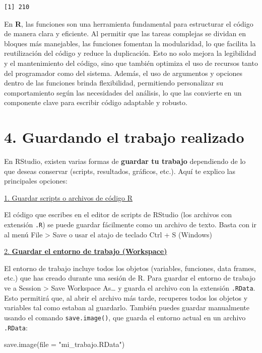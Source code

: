 \documentclass[
  letterpaper,
  DIV=11,
  numbers=noendperiod]{scrreprt}
\newenvironment{Shaded}{\begin{snugshade}}{\end{snugshade}}
\newcommand{\AttributeTok}[1]{\textcolor[rgb]{0.40,0.45,0.13}{#1}}
\newcommand{\FunctionTok}[1]{\textcolor[rgb]{0.28,0.35,0.67}{#1}}
\newcommand{\NormalTok}[1]{\textcolor[rgb]{0.00,0.23,0.31}{#1}}
\newcommand{\StringTok}[1]{\textcolor[rgb]{0.13,0.47,0.30}{#1}}
\begin{document}
\begin{verbatim}
[1] 210
\end{verbatim}

En \textbf{R}, las funciones son una herramienta fundamental para
estructurar el código de manera clara y eficiente. Al permitir que las
tareas complejas se dividan en bloques más manejables, las funciones
fomentan la modularidad, lo que facilita la reutilización del código y
reduce la duplicación. Esto no solo mejora la legibilidad y el
mantenimiento del código, sino que también optimiza el uso de recursos
tanto del programador como del sistema. Además, el uso de argumentos y
opciones dentro de las funciones brinda flexibilidad, permitiendo
personalizar su comportamiento según las necesidades del análisis, lo
que las convierte en un componente clave para escribir código adaptable
y robusto.

\hypertarget{guardando-el-trabajo-realizado}{%
\section{4. Guardando el trabajo
realizado}\label{guardando-el-trabajo-realizado}}

En RStudio, existen varias formas de \textbf{guardar tu trabajo}
dependiendo de lo que deseas conservar (scripts, resultados, gráficos,
etc.). Aquí te explico las principales opciones:

\uline{1. Guardar scripts o archivos de código R}

El código que escribes en el editor de scripts de RStudio (los archivos
con extensión \texttt{.R}) se puede guardar fácilmente como un archivo
de texto. Basta con ir al menú File \textgreater{} Save o usar el atajo
de teclado Ctrl + S (Windows)

\uline{2. \textbf{Guardar el entorno de trabajo (Workspace)}}

El entorno de trabajo incluye todos los objetos (variables, funciones,
data frames, etc.) que has creado durante una sesión de R. Para guardar
el entorno de trabajo ve a Session \textgreater{} Save Workspace
As\ldots{} y guarda el archivo con la extensión \texttt{.RData}. Esto
permitirá que, al abrir el archivo más tarde, recuperes todos los
objetos y variables tal como estaban al guardarlo. También puedes
guardar manualmente usando el comando \texttt{save.image()}, que guarda
el entorno actual en un archivo \texttt{.RData}:

\begin{Shaded}
\begin{Highlighting}[]
\FunctionTok{save.image}\NormalTok{(}\AttributeTok{file =} \StringTok{"mi\_trabajo.RData"}\NormalTok{) }
\end{Highlighting}
\end{Shaded}
\end{document}
